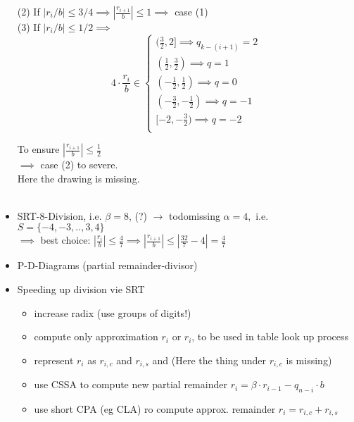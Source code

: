 \begin{itemize}
(2) If $|r_i/b|\le 3/4 \implies |\frac{r_{i+1}}{b}|\le 1 \implies$ case (1) \\

(3) If $|r_i/b|\le 1/2 \implies $  \\

\[
	4\cdot \frac{r_i}{b} \in
	\begin{cases}
	(\frac{3}{2},2] \implies q_{k-(i+1)}=2\\
	(\frac{1}{2},\frac{3}{2}) \implies q=1\\
	(-\frac{1}{2},\frac{1}{2}) \implies q=0\\
	(-\frac{3}{2},-\frac{1}{2}) \implies q=-1\\
	[-2,-\frac{3}{2}) \implies q=-2\\
	\end{cases}
\]

To ensure $|\frac{r_{i+1}}{b}|\le \frac{1}{2}$ \\
$\implies$ case (2) to severe. \\

Here the drawing is missing. \\
\\

\item SRT-8-Division, i.e. $\beta=8$, (?) $\to$ todo{missing} $\alpha=4, $ i.e. $S=\{-4,-3,..,3,4\}$ \\
$\implies$ best choice: $|\frac{r_i}{b}|\le \frac{4}{7} \implies |\frac{r_{i+1}}{b}|\le |\frac{32}{7}-4|=\frac{4}{7}$


\item P-D-Diagrams (partial remainder-divisor) \\
\item Speeding up division vie SRT
	\begin{itemize}
		\item increase radix (use groups of digits!)
		\item compute only approximation $r_i$ or $r_i$, to be used in table look up process
		\item represent $r_i$ as $r_{i,c}$ and $r_{i,s}$ and (Here the thing under $r_{i,c}$ is missing)
		\item use CSSA to compute new partial remainder 
		$r_i=\beta\cdot r_{i-1} -q_{n-i}\cdot b$ 
		\item use short CPA (eg CLA) ro compute approx. remainder $r_i=r_{i,c}+r_{i,s}$
	\end{itemize}
\end{itemize}


